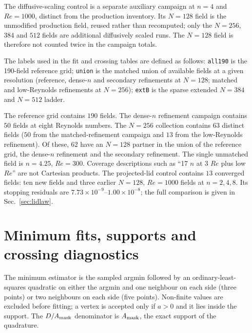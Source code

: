 \documentclass[11pt]{article}
\begin{document}
The diffusive-scaling control is a separate auxiliary campaign at $n=4$ and
$Re=1000$, distinct from the production inventory. Its $N=128$ field is the
unmodified production field, reused rather than recomputed; only the
$N=256$, $384$ and $512$ fields are additional diffusively scaled runs. The
$N=128$ field is therefore not counted twice in the campaign totals.


The labels used in the fit and crossing tables are defined as follows:
\texttt{all190} is the 190-field reference grid; \texttt{union} is the matched
union of available fields at a given resolution (reference, dense-$n$ and
secondary refinements at $N=128$; matched and low-Reynolds refinements at
$N=256$); \texttt{extB} is the sparse extended $N=384$ and $N=512$ ladder.

The reference grid contains $190$ fields. The dense-$n$ refinement campaign
contains $50$ fields at eight Reynolds numbers. The $N=256$ collection contains
$63$ distinct fields ($50$ from the matched-refinement campaign and $13$ from
the low-Reynolds refinement). Of these, $62$ have an $N=128$ partner in the union
of the reference grid, the dense-$n$ refinement and the secondary refinement.
The single unmatched field is $n=4.25$, $Re=300$. Coverage descriptions such
as ``17 $n$ at 3 $Re$ plus low $Re$'' are not Cartesian products. The
projected-lid control contains $13$ converged fields: ten new fields and three
earlier $N=128$, $Re=1000$ fields at $n=2,4,8$. Its stopping residuals are
$7.73\times10^{-9}$--$1.00\times10^{-8}$; the full comparison is given in
Sec.~\ref{sec:lidlaw}.

\section{Minimum fits, supports and crossing diagnostics}
\label{sec:fits}

The minimum estimator is the sampled argmin followed by an ordinary-least-squares
quadratic on either the argmin and one neighbour on each side (three points) or
two neighbours on each side (five points). Non-finite values are excluded
before fitting; a vertex is accepted only if $a>0$ and it lies inside the
support. The $D/A_{\rm mask}$ denominator is $A_{\rm mask}$, the exact support
of the quadrature.
\end{document}
